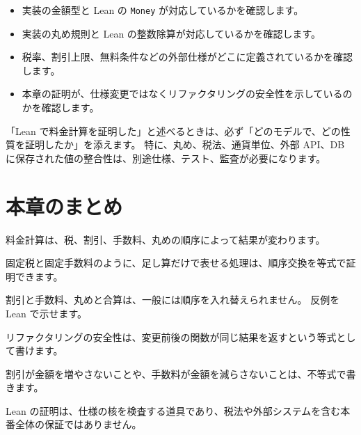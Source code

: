 \begin{itemize}
\item 実装の金額型と Lean の \texttt{Money} が対応しているかを確認します。
\item 実装の丸め規則と Lean の整数除算が対応しているかを確認します。
\item 税率、割引上限、無料条件などの外部仕様がどこに定義されているかを確認します。
\item 本章の証明が、仕様変更ではなくリファクタリングの安全性を示しているのかを確認します。
\end{itemize}

「Lean で料金計算を証明した」と述べるときは、必ず「どのモデルで、どの性質を証明したか」を添えます。
特に、丸め、税法、通貨単位、外部 API、DB に保存された値の整合性は、別途仕様、テスト、監査が必要になります。

\section{本章のまとめ}

料金計算は、税、割引、手数料、丸めの順序によって結果が変わります。

固定税と固定手数料のように、足し算だけで表せる処理は、順序交換を等式で証明できます。

割引と手数料、丸めと合算は、一般には順序を入れ替えられません。
反例を Lean で示せます。

リファクタリングの安全性は、変更前後の関数が同じ結果を返すという等式として書けます。

割引が金額を増やさないことや、手数料が金額を減らさないことは、不等式で書きます。

Lean の証明は、仕様の核を検査する道具であり、税法や外部システムを含む本番全体の保証ではありません。

